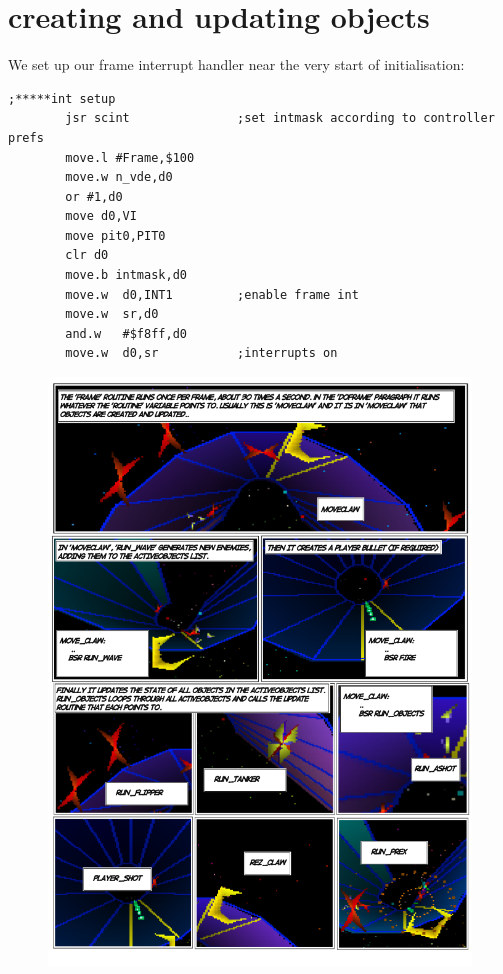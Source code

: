 \section*{creating and updating objects}
We set up our frame interrupt handler near the very start of initialisation:

\begin{lstlisting}
;*****int setup
        jsr scint               ;set intmask according to controller prefs
        move.l #Frame,$100
        move.w n_vde,d0
        or #1,d0
        move d0,VI
        move pit0,PIT0
        clr d0
        move.b intmask,d0
        move.w  d0,INT1         ;enable frame int
        move.w  sr,d0
        and.w   #$f8ff,d0
        move.w  d0,sr           ;interrupts on
\end{lstlisting}

\begin{figure}[H]
      \centering
      \includegraphics[width=13.7cm]{src/mainloop/mainloop-run_objects-comic.png}%
\end{figure}

